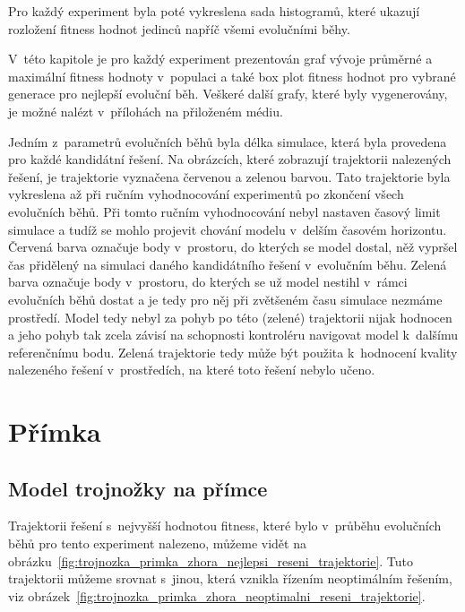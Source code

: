 Pro každý experiment byla poté vykreslena sada histogramů, které ukazují rozložení fitness hodnot jedinců napříč všemi evolučními běhy.

V~této kapitole je pro každý experiment prezentován graf vývoje průměrné a maximální fitness hodnoty v~populaci a také box plot fitness hodnot pro vybrané generace pro nejlepší evoluční běh.
Veškeré další grafy, které byly vygenerovány, je možné nalézt v~přílohách na přiloženém médiu.

Jedním z~parametrů evolučních běhů byla délka simulace, která byla provedena pro každé kandidátní řešení.
Na obrázcích, které zobrazují trajektorii nalezených řešení, je trajektorie vyznačena červenou a zelenou barvou.
Tato trajektorie byla vykreslena až při ručním vyhodnocování experimentů po zkončení všech evolučních běhů.
Při tomto ručním vyhodnocování nebyl nastaven časový limit simulace a tudíž se mohlo projevit chování modelu v~delším časovém horizontu.
Červená barva označuje body v~prostoru, do kterých se model dostal, něž vypršel čas přidělený na simulaci daného kandidátního řešení v~evolučním běhu.
Zelená barva označuje body v~prostoru, do kterých se už model nestihl v~rámci evolučních běhů dostat a je tedy pro něj při zvětšeném času simulace nezmáme prostředí.
Model tedy nebyl za pohyb po této (zelené) trajektorii nijak hodnocen a jeho pohyb tak zcela závisí na schopnosti kontroléru navigovat model k~dalšímu referenčnímu bodu.
Zelená trajektorie tedy může být použita k~hodnocení kvality nalezeného řešení v~prostředích, na které toto řešení nebylo učeno.

\section{Přímka}

\subsection{Model trojnožky na přímce}
Trajektorii řešení s~nejvyšší hodnotou fitness, které bylo v~průběhu evolučních běhů pro tento experiment nalezeno, můžeme vidět na obrázku~\ref{fig:trojnozka_primka_zhora_nejlepsi_reseni_trajektorie}.
Tuto trajektorii můžeme srovnat s~jinou, která vznikla řízením neoptimálním řešením, viz obrázek~\ref{fig:trojnozka_primka_zhora_neoptimalni_reseni_trajektorie}.


